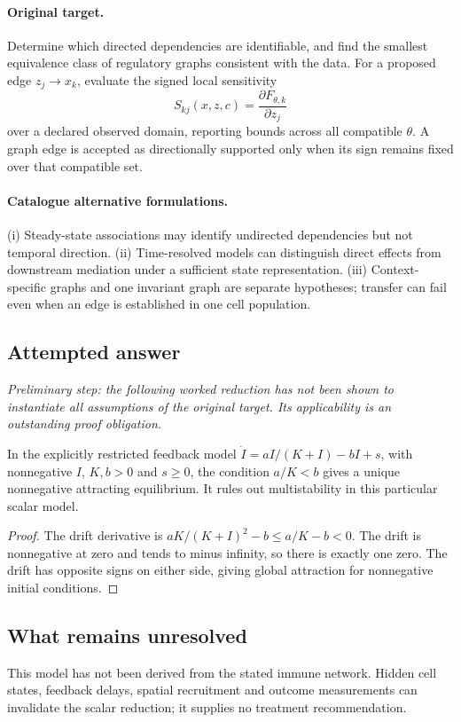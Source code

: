\documentclass[11pt]{article}
\begin{document}
\paragraph{Original target.}
Determine which directed dependencies are identifiable, and find the smallest equivalence class of regulatory graphs consistent with the data. For a proposed edge $z_j\to x_k$, evaluate the signed local sensitivity
    \[S_{kj}(x,z,c)=\frac{\partial F_{\theta,k}}{\partial z_j}\]
    over a declared observed domain, reporting bounds across all compatible $\theta$. A graph edge is accepted as directionally supported only when its sign remains fixed over that compatible set.
\paragraph{Catalogue alternative formulations.}
(i) Steady-state associations may identify undirected dependencies but not temporal direction. (ii) Time-resolved models can distinguish direct effects from downstream mediation under a sufficient state representation. (iii) Context-specific graphs and one invariant graph are separate hypotheses; transfer can fail even when an edge is established in one cell population.
\subsection{Attempted answer}
\noindent\emph{Preliminary step: the following worked reduction has not been shown to instantiate all assumptions of the original target. Its applicability is an outstanding proof obligation.}

\begin{proposition}
In the explicitly restricted feedback model $\dot I=aI/(K+I)-bI+s$, with nonnegative $I$, $K,b>0$ and $s\geq0$, the condition $a/K<b$ gives a unique nonnegative attracting equilibrium. It rules out multistability in this particular scalar model.
\end{proposition}
\begin{proof}
The drift derivative is $aK/(K+I)^2-b\leq a/K-b<0$. The drift is nonnegative at zero and tends to minus infinity, so there is exactly one zero. The drift has opposite signs on either side, giving global attraction for nonnegative initial conditions.
\end{proof}
\subsection{What remains unresolved}
This model has not been derived from the stated immune network. Hidden cell states, feedback delays, spatial recruitment and outcome measurements can invalidate the scalar reduction; it supplies no treatment recommendation.
\end{document}
